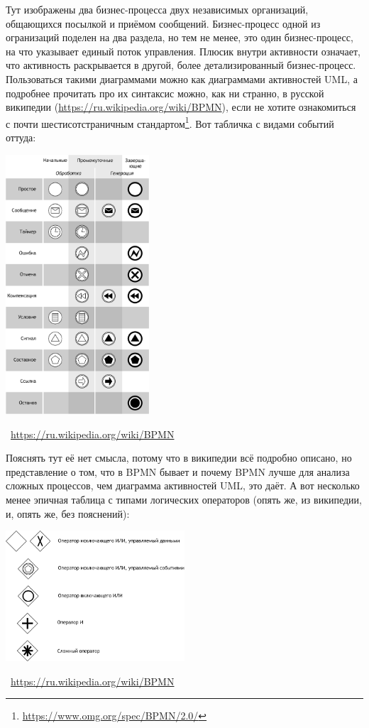 \documentclass[a5paper]{article}
\newcommand{\attribution}[1] {
    \vspace{-4mm}\begin{flushright}\begin{scriptsize}%
    {\textcopyright\, #1}\end{scriptsize}\end{flushright}
}
\begin{document}
Тут изображены два бизнес-процесса двух независимых организаций, общающихся посылкой и приёмом сообщений. Бизнес-процесс одной из огранизаций поделен на два раздела, но тем не менее, это один бизнес-процесс, на что указывает единый поток управления. Плюсик внутри активности означает, что активность раскрывается в другой, более детализированный бизнес-процесс. Пользоваться такими диаграммами можно как диаграммами активностей UML, а подробнее прочитать про их синтаксис можно, как ни странно, в русской википедии (\url{https://ru.wikipedia.org/wiki/BPMN}), если не хотите ознакомиться с почти шестисотстраничным стандартом\footnote{\url{https://www.omg.org/spec/BPMN/2.0/}}. Вот табличка с видами событий оттуда:

\begin{center}
    \includegraphics[width=0.4\textwidth]{bpmnEvents.png}
    \attribution{\url{https://ru.wikipedia.org/wiki/BPMN}}
\end{center}

Пояснять тут её нет смысла, потому что в википедии всё подробно описано, но представление о том, что в BPMN бывает и почему BPMN лучше для анализа сложных процессов, чем диаграмма активностей UML, это даёт. А вот несколько менее эпичная таблица с типами логических операторов (опять же, из википедии, и, опять же, без пояснений):

\begin{center}
    \includegraphics[width=0.5\textwidth]{bpmnGateways.png}
    \attribution{\url{https://ru.wikipedia.org/wiki/BPMN}}
\end{center}
\end{document}
